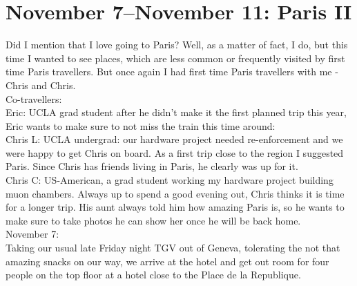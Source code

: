 \section{November 7--November 11: Paris II}
\label{2013ParisII}

Did I mention that I love going to Paris? Well, as a matter of fact, I do, but this time I wanted to see places, which are less common or frequently visited by first time Paris travellers. But once again I had first time Paris travellers with me - Chris and Chris.\\

Co-travellers:\\
Eric: UCLA grad student after he didn't make it the first planned trip this year, Eric wants to make sure to not miss the train this time around:\\
Chris L: UCLA undergrad: our hardware project needed re-enforcement and we were happy to get Chris on board. As a first trip close to the region I suggested Paris. Since Chris has friends living in Paris, he clearly was up for it.\\
Chris C: US-American, a grad student working my hardware project building muon chambers. Always up to spend a good evening out, Chris thinks it is time for a longer trip. His aunt always told him how amazing Paris is, so he wants to make sure to take photos he can show her once he will be back home.\\

November 7:\\
Taking our usual late Friday night TGV out of Geneva, tolerating the not that amazing snacks on our way, we arrive at the hotel and get out room for four people on the top floor at a hotel close to the Place de la Republique.\\

